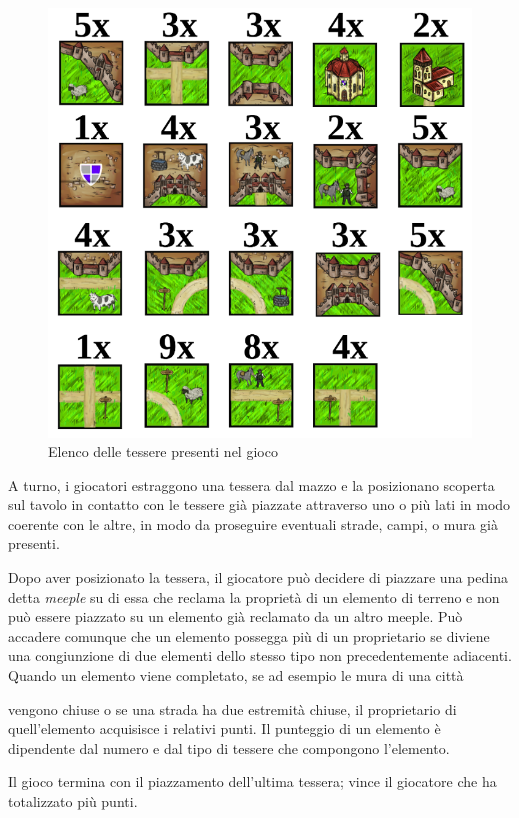 \begin{figure}[H]
\centering
\includegraphics[scale=0.4]{img/tiles.png}
\caption{Elenco delle tessere presenti nel gioco}
\label{img:tiles}
\end{figure}

A turno, i giocatori estraggono una tessera dal mazzo e la posizionano scoperta sul tavolo
in contatto con le tessere già piazzate attraverso uno o più lati in modo coerente con le altre, 
in modo da proseguire eventuali strade, campi, o mura già presenti.

Dopo aver posizionato la tessera, il giocatore può decidere di piazzare
una pedina detta \emph{meeple} su di essa che reclama la proprietà di un elemento di terreno
 e non può essere piazzato su un elemento già reclamato da un altro
meeple. Può accadere comunque che un elemento possegga più di un
proprietario se diviene una congiunzione di due elementi dello stesso
tipo non precedentemente adiacenti.
Quando un elemento viene completato, se ad esempio le mura di una città

vengono chiuse o se una strada ha due estremità chiuse, il proprietario
di quell'elemento acquisisce i relativi punti. Il punteggio di un
elemento è dipendente dal numero e dal tipo di tessere che compongono
l'elemento.

Il gioco termina con il piazzamento dell'ultima tessera; vince il giocatore che ha totalizzato più punti.

